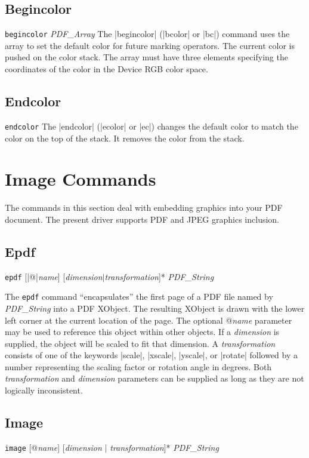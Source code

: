 {\subsection{Begincolor}
\syntax
{\tt begincolor} {\it PDF\_Array}
\description
The |begincolor| (|bcolor| or |bc|) command uses the
array to set the default color for future marking operators.
The current color is pushed on the color stack.  The
array must have three elements specifying the coordinates
of the color in the Device RGB color space.
\example
\begintt
{}
\endtt

\subsection{Endcolor}
\syntax
{\tt endcolor}
\description
The |endcolor| (|ecolor| or |ec|)
changes the default color to
match the color on the top
of the stack.  It removes
the color from the stack.
\example
\begintt
{}
\endtt


\section{Image Commands}
The commands in this section deal with embedding
graphics into your PDF document.  The present
driver supports PDF and JPEG graphics inclusion.

\subsection{Epdf}
\syntax
{\tt epdf} [|@|{\it name}] [{\it dimension}$\vert${\it transformation}]*  {\it PDF\_String}

\description
The {\tt epdf} command ``encapsulates'' the first page of a PDF
file named by {\it PDF\_String}
into a PDF XObject.  The resulting XObject is drawn
with the lower left corner at the current location of the page.
The optional @{\it name} parameter may be used
to reference this object within other objects.  If a
{\it dimension} is supplied, the object will be scaled to fit
that dimension.  A {\it transformation} consists of one of the keywords
|scale|, |xscale|, |yscale|, or |rotate|
followed by a number representing
the scaling factor or rotation angle in degrees.  Both {\it transformation} and {\it dimension}
parameters can be supplied as long as they are not logically
inconsistent.
\example
\begintt
{}
\endtt

\subsection{Image}
\syntax
{\tt image} [@{\it name}] [{\it dimension} $\vert$ {\it transformation}]*  {\it PDF\_String}

}
